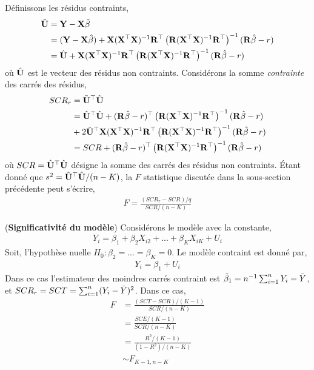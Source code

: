 Définissons les résidus contraints,
\begin{align*}
\tilde{\mathbf U}&=\mathbf Y-\mathbf X\tilde{\beta}\\
&=(\mathbf Y-\mathbf X\hat{\beta}) + \mathbf X(\mathbf X^\top\mathbf X)^{-1}\mathbf{R}^\top\left(\mathbf{R}(\mathbf X^\top\mathbf X)^{-1}\mathbf{R}^\top\right)^{-1}(\mathbf{R}\hat{\beta}-r)\\
&=\hat{\mathbf U} + \mathbf X(\mathbf X^\top\mathbf X)^{-1}\mathbf{R}^\top\left(\mathbf{R}(\mathbf X^\top\mathbf X)^{-1}\mathbf{R}^\top\right)^{-1}(\mathbf{R}\hat{\beta}-r)
\end{align*}
où $\hat{\mathbf U}$ est le vecteur des résidus non contraints. Considérons la somme \emph{contrainte} des carrés des résidus,
\begin{align*}
SCR_r &= \tilde{\mathbf U}^\top\tilde{\mathbf U}\\
&= \hat{\mathbf U}^\top\hat{\mathbf U} + (\mathbf{R}\hat{\beta} - r)^\top
\left(\mathbf{R}(\mathbf X^\top \mathbf X)^{-1}\mathbf{R}^\top\right)^{-1}(\mathbf{R}\hat{\beta} - r)\\
&+ 2\hat{\mathbf U}^\top\mathbf X(\mathbf X^\top\mathbf X)^{-1}\mathbf{R}^\top\left(\mathbf{R}(\mathbf X^\top\mathbf X)^{-1}\mathbf{R}^\top\right)^{-1}(\mathbf{R}\hat{\beta}-r)\\
&=SCR + (\mathbf{R}\hat{\beta}-r)^\top\left(\mathbf{R}(\mathbf X^\top\mathbf X)^{-1}\mathbf{R}^\top\right)^{-1}  (\mathbf{R}\hat{\beta}-r)
\end{align*}
où $SCR = \hat{\mathbf U}^\top\hat{\mathbf U}$ désigne la somme des carrés des résidus non contraints. \'Etant donné que $s^2 = \hat{\mathbf U}^\top\hat{\mathbf U}/(n-K)$, la $F$ statistique discutée dans la sous-section précédente peut s'écrire,
\begin{align}
F = \frac{(SCR_r -SCR)/q}{SCR/(n-K)}
\label{eq46}
\end{align}
\begin{exemple}
(\textbf{Significativité du modèle}) Considérons le modèle avec la constante,
\begin{align*}
Y_i = \beta_1 + \beta_2X_{i2} + ...+\beta_KX_{iK} + U_i
\end{align*}
Soit, l'hypothèse nuelle $H_0: \beta_2 = ...=\beta_K =0$. Le modèle contraint est donné par,
\begin{align*}
Y_i = \beta_1 + U_i
\end{align*}
Dans ce cas l'estimateur des moindres carrés contraint est $\tilde{\beta}_1 =n^{-1}\sum_{i=1}^n Y_i = \bar{Y}$, et $SCR_r =SCT =\sum_{i=1}^n (Y_i-\bar{Y})^2$. Dans ce cas,
\begin{align*}
F &=\frac{(SCT -SCR)/(K-1)}{SCR/(n-K)}\\
&=\frac{SCE/(K-1)}{SCR/(n-K)}\\
&= \frac{R^2/(K-1)}{(1-R^2)/(n-K)}\\
&\sim F_{K-1, n-K}
\end{align*}
\label{ex1}
\end{exemple}
